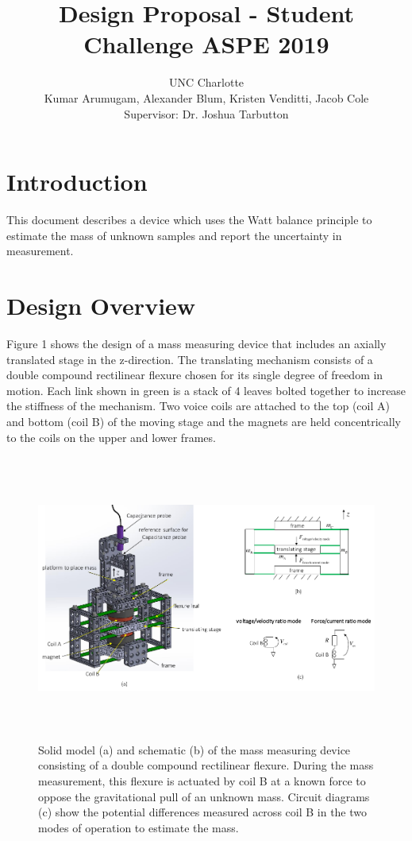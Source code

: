\documentclass[12pt]{article}
\title{\vspace{-1cm}Design Proposal - Student Challenge ASPE 2019}
\date{}
\author{UNC Charlotte\\ Kumar Arumugam, Alexander Blum, Kristen Venditti, Jacob Cole\\ Supervisor: Dr. Joshua Tarbutton}
\begin{document}
\maketitle

\section{Introduction}

This document describes a device which uses the Watt balance principle to estimate the mass of unknown samples and report the uncertainty in measurement.


\section{Design Overview}

Figure 1 shows the design of a mass measuring device that includes an axially translated stage in the z-direction. The translating mechanism consists of a double compound rectilinear flexure \cite{smith2000} chosen for its single degree of freedom in motion. Each link shown in green is a stack of 4 leaves bolted together to increase the stiffness of the mechanism. Two voice coils are attached to the top (coil A) and bottom (coil B) of the moving stage and the magnets are held concentrically to the coils on the upper and lower frames. 

\begin{figure}[ht!]
	\centering
	\includegraphics[height = 3.7in]{fig1}
	\caption{Solid model (a) and schematic (b) of the mass measuring device consisting of a double compound rectilinear flexure. During the mass measurement, this flexure is actuated by coil B at a known force to oppose the gravitational pull of an unknown mass. Circuit diagrams (c) show the potential differences measured across coil B in the two modes of operation to estimate the mass.}
	\label{fig:1}
\end{figure}
\pagebreak
\end{document}

